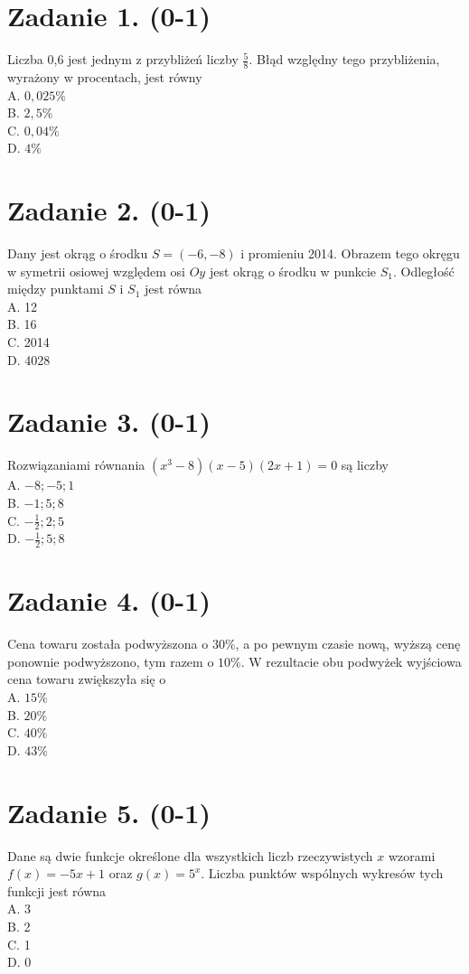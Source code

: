\documentclass[10pt]{article}
\begin{document}
\section*{Zadanie 1. (0-1)}
Liczba 0,6 jest jednym z przybliżeń liczby \(\frac{5}{8}\). Błąd względny tego przybliżenia, wyrażony w procentach, jest równy\\
A. \(0,025 \%\)\\
B. \(2,5 \%\)\\
C. \(0,04 \%\)\\
D. \(4 \%\)

\section*{Zadanie 2. (0-1)}
Dany jest okrąg o środku \(S=(-6,-8)\) i promieniu 2014. Obrazem tego okręgu w symetrii osiowej względem osi \(O y\) jest okrąg o środku w punkcie \(S_{1}\). Odległość między punktami \(S\) i \(S_{1}\) jest równa\\
A. 12\\
B. 16\\
C. 2014\\
D. 4028

\section*{Zadanie 3. (0-1)}
Rozwiązaniami równania \(\left(x^{3}-8\right)(x-5)(2 x+1)=0\) są liczby\\
A. \(-8 ;-5 ; 1\)\\
B. \(-1 ; 5 ; 8\)\\
C. \(-\frac{1}{2} ; 2 ; 5\)\\
D. \(-\frac{1}{2} ; 5 ; 8\)

\section*{Zadanie 4. (0-1)}
Cena towaru została podwyższona o \(30 \%\), a po pewnym czasie nową, wyższą cenę ponownie podwyższono, tym razem o \(10 \%\). W rezultacie obu podwyżek wyjściowa cena towaru zwiększyła się o\\
A. \(15 \%\)\\
B. \(20 \%\)\\
C. \(40 \%\)\\
D. \(43 \%\)

\section*{Zadanie 5. (0-1)}
Dane są dwie funkcje określone dla wszystkich liczb rzeczywistych \(x\) wzorami \(f(x)=-5 x+1\) oraz \(g(x)=5^{x}\). Liczba punktów wspólnych wykresów tych funkcji jest równa\\
A. 3\\
B. 2\\
C. 1\\
D. 0
\end{document}
